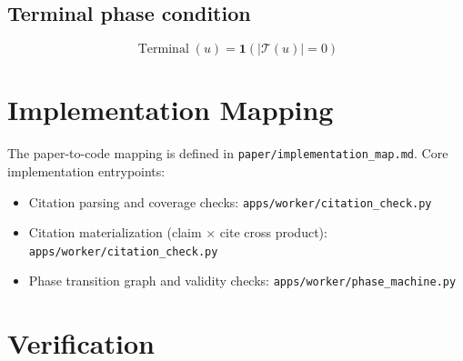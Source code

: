 \documentclass[11pt]{article}
\begin{document}
\subsection{Terminal phase condition}
\begin{equation}
\operatorname{Terminal}(u) = \mathbf{1}(|\mathcal{T}(u)| = 0)
\label{eq:terminal_phase}
\end{equation}

\section{Implementation Mapping}\label{sec:implementation}
The paper-to-code mapping is defined in \texttt{paper/implementation\_map.md}. Core implementation entrypoints:
\begin{itemize}
  \item Citation parsing and coverage checks: \texttt{apps/worker/citation\_check.py}
  \item Citation materialization (claim $\times$ cite cross product): \texttt{apps/worker/citation\_check.py}
  \item Phase transition graph and validity checks: \texttt{apps/worker/phase\_machine.py}
\end{itemize}

\section{Verification}\label{sec:verification}
\end{document}
